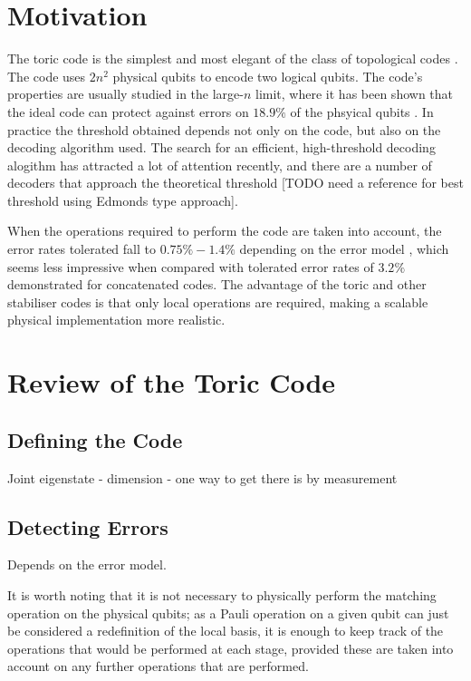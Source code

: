 
\section{Motivation}


The toric code is the simplest and most elegant of the class of topological codes \cite{topological_codes}. The code uses $2n^2$ physical qubits to encode two logical qubits. The code's properties are usually studied in the large-$n$ limit, where it has been shown that the ideal code can protect against errors on $18.9\%$ of the phsyical qubits \cite{bombin12}. In practice the threshold obtained depends not only on the code, but also on the decoding algorithm used. The search for an efficient, high-threshold decoding alogithm has attracted a lot of attention recently, and there are a number of decoders that approach the theoretical threshold \cite{wooton_mcmc1, poulin_renormalisation, poulin_renormalisation2} [TODO need a reference for best threshold using Edmonds type approach].

When the operations required to perform the code are taken into account, the error rates tolerated fall to $0.75\% - 1.4\%$ depending on the error model \cite{raussendorf07, fowler11, ghosh_fowler}, which seems less impressive when compared with tolerated error rates of $3.2\%$ \cite{?Knill} demonstrated for concatenated codes. The advantage of the toric and other stabiliser codes is that only local operations are required, making a scalable physical implementation more realistic.


\section{Review of the Toric Code}

\subsection{Defining the Code}



Joint eigenstate - dimension - one way to get there is by measurement




\subsection{Detecting Errors}



Depends on the error model.


It is worth noting that it is not necessary to physically perform the matching operation on the physical qubits; as a Pauli operation on a given qubit can just be considered a redefinition of the local basis, it is enough to keep track of the operations that would be performed at each stage, provided these are taken into account on any further operations that are performed.


